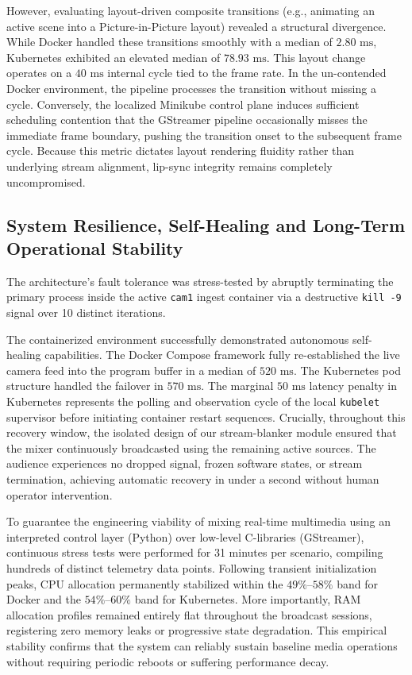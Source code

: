\documentclass[electronics,article,submit,pdftex,moreauthors]{Definitions/mdpi}
\begin{document}
However, evaluating layout-driven composite transitions (e.g., animating an active scene into a Picture-in-Picture layout) revealed a structural divergence. While Docker handled these transitions smoothly with a median of $2.80\text{ ms}$, Kubernetes exhibited an elevated median of $78.93\text{ ms}$. This layout change operates on a $40\text{ ms}$ internal cycle tied to the frame rate. In the un-contended Docker environment, the pipeline processes the transition without missing a cycle. Conversely, the localized Minikube control plane induces sufficient scheduling contention that the GStreamer pipeline occasionally misses the immediate frame boundary, pushing the transition onset to the subsequent frame cycle. Because this metric dictates layout rendering fluidity rather than underlying stream alignment, lip-sync integrity remains completely uncompromised.

\subsection{System Resilience, Self-Healing and Long-Term Operational Stability}

The architecture's fault tolerance was stress-tested by abruptly terminating the primary process inside the active \texttt{cam1} ingest container via a destructive \texttt{kill -9} signal over 10 distinct iterations.

The containerized environment successfully demonstrated autonomous self-healing capabilities. The Docker Compose framework fully re-established the live camera feed into the program buffer in a median of $520\text{ ms}$. The Kubernetes pod structure handled the failover in $570\text{ ms}$. The marginal $50\text{ ms}$ latency penalty in Kubernetes represents the polling and observation cycle of the local \texttt{kubelet} supervisor before initiating container restart sequences. Crucially, throughout this recovery window, the isolated design of our stream-blanker module ensured that the mixer continuously broadcasted using the remaining active sources. The audience experiences no dropped signal, frozen software states, or stream termination, achieving automatic recovery in under a second without human operator intervention.

To guarantee the engineering viability of mixing real-time multimedia using an interpreted control layer (Python) over low-level C-libraries (GStreamer), continuous stress tests were performed for 31 minutes per scenario, compiling hundreds of distinct telemetry data points. Following transient initialization peaks, CPU allocation permanently stabilized within the $49\%\text{--}58\%$ band for Docker and the $54\%\text{--}60\%$ band for Kubernetes. More importantly, RAM allocation profiles remained entirely flat throughout the broadcast sessions, registering zero memory leaks or progressive state degradation. This empirical stability confirms that the system can reliably sustain baseline media operations without requiring periodic reboots or suffering performance decay.
\end{document}
